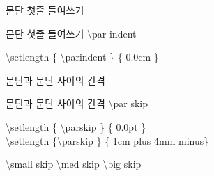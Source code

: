 \documentclass[ aspectratio=149,  14pt,blue,xcolor=pdftex,dvipsnames,table,handout,notes]{beamer}
\begin{document}
		\begin{frame}[t]{문단 첫줄 들여쓰기}

			\begin{block} {문단 첫줄 들여쓰기}
			\textbackslash par indent
			\end{block}

			\begin{example}
			\textbackslash setlength \{ \textbackslash parindent \} \{ 0.0cm \}\\
			\end{example}

		
		\end{frame}

		\begin{frame}[t]{문단과 문단 사이의 간격}

			\begin{block} {문단과 문단 사이의 간격}
			\textbackslash par skip
			\end{block}

			\begin{example}
			\textbackslash setlength \{ \textbackslash parskip \} \{ 0.0pt \}\\
			\textbackslash setlength \{\textbackslash parskip \} \{ 1cm plus 4mm minus\}	\\		
			\end{example}

			\begin{example}
			\textbackslash small skip
			\textbackslash med skip
			\textbackslash big skip
			\end{example}

		
		\end{frame}
\end{document}
